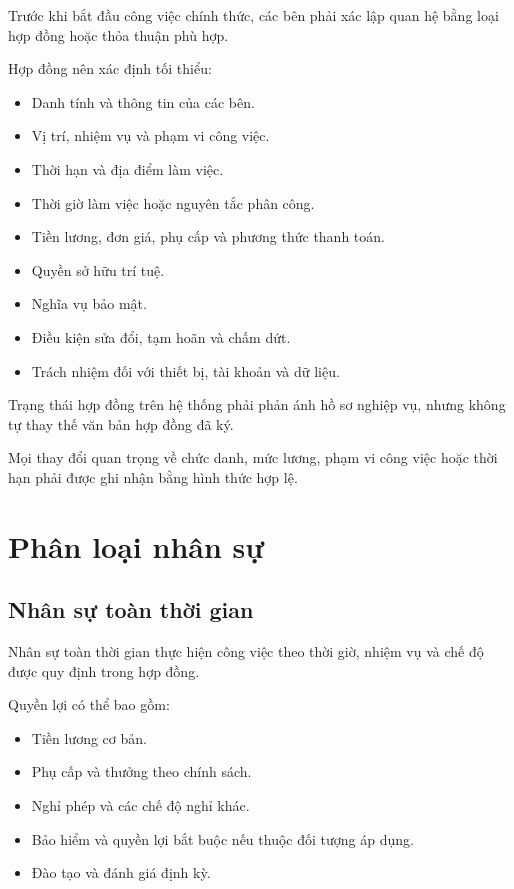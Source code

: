 \documentclass[12pt,a4paper]{article}
\begin{document}
Trước khi bắt đầu công việc chính thức, các bên phải xác lập quan hệ
bằng loại hợp đồng hoặc thỏa thuận phù hợp.

Hợp đồng nên xác định tối thiểu:

\begin{itemize}
    \item Danh tính và thông tin của các bên.
    \item Vị trí, nhiệm vụ và phạm vi công việc.
    \item Thời hạn và địa điểm làm việc.
    \item Thời giờ làm việc hoặc nguyên tắc phân công.
    \item Tiền lương, đơn giá, phụ cấp và phương thức thanh toán.
    \item Quyền sở hữu trí tuệ.
    \item Nghĩa vụ bảo mật.
    \item Điều kiện sửa đổi, tạm hoãn và chấm dứt.
    \item Trách nhiệm đối với thiết bị, tài khoản và dữ liệu.
\end{itemize}

Trạng thái hợp đồng trên hệ thống phải phản ánh hồ sơ nghiệp vụ,
nhưng không tự thay thế văn bản hợp đồng đã ký.

Mọi thay đổi quan trọng về chức danh, mức lương, phạm vi công việc
hoặc thời hạn phải được ghi nhận bằng hình thức hợp lệ.

\section{Phân loại nhân sự}

\subsection{Nhân sự toàn thời gian}

Nhân sự toàn thời gian thực hiện công việc theo thời giờ,
nhiệm vụ và chế độ được quy định trong hợp đồng.

Quyền lợi có thể bao gồm:

\begin{itemize}
    \item Tiền lương cơ bản.
    \item Phụ cấp và thưởng theo chính sách.
    \item Nghỉ phép và các chế độ nghỉ khác.
    \item Bảo hiểm và quyền lợi bắt buộc nếu thuộc đối tượng áp dụng.
    \item Đào tạo và đánh giá định kỳ.
\end{itemize}
\end{document}
